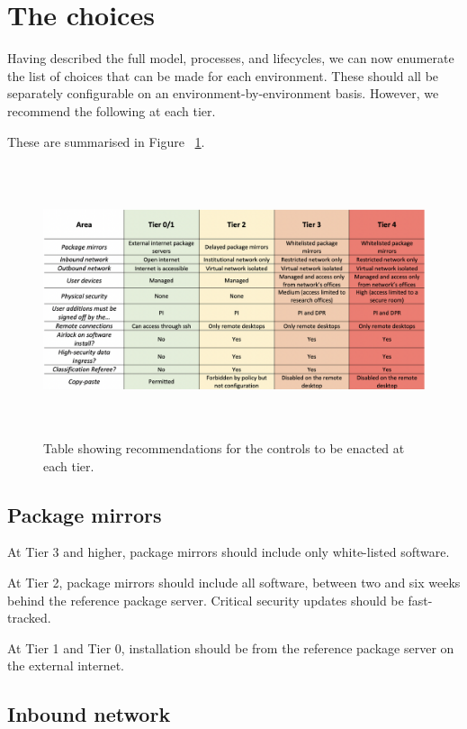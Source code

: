 \documentclass[10pt,a4paper,twocolumn]{article}
\begin{document}
\section{The choices}
\label{sec:choices}

Having described the full model, processes, and lifecycles, we can now enumerate the list of choices that
can be made for each environment. These should all be separately configurable on an environment-by-environment basis. However, we recommend the following at each tier.

These are summarised in Figure ~\ref{controls}.

\begin{figure}[htbp]
  \centering
  \includegraphics[width=16cm, height=8cm]{controls}
  \caption{\label{controls} Table showing recommendations for the controls to be enacted at each tier.}
\end{figure}

\subsection{Package mirrors}

At Tier 3 and higher, package mirrors should include only white-listed software.

At Tier 2, package mirrors should include all software, between two and six weeks behind the reference package server.
Critical security updates should be fast-tracked.

At Tier 1 and Tier 0, installation should be from the reference package server on the external internet.

\subsection{Inbound network}
\end{document}
